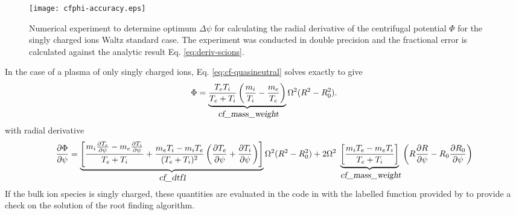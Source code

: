 \begin{figure}
\begin{center}
\texttt{[image: cfphi-accuracy.eps]}
\caption{Numerical experiment to determine optimum $\Delta \psi$ for calculating the radial derivative of the centrifugal potential $\Phi$ for the singly charged ions Waltz standard case. The experiment was conducted in double precision and the fractional error is calculated against the analytic result Eq. \ref{eq:deriv-scions}.}

\label{fig:cfphi-acc}
\end{center}
\end{figure}

In the case of a plasma of only singly charged ions, Eq. \ref{eq:cf-quasineutral} solves exactly to give
\begin{equation}
 \Phi = \underbrace{{T_e T_i \over T_e + T_i} \left({m_i \over T_i} - {m_e \over T_e}\right)}_{\name{cf_mass_weight}} \Omega^2 (R^2-R_0^2).
\label{eq:scions}
\end{equation}
with radial derivative 
\begin{equation}
 {\partial \Phi \over \partial \psi} = \underbrace{\left[{m_i {\partial T_e \over \partial \psi}- m_e {\partial T_i \over \partial \psi}\over T_e + T_i} + 
{m_e T_i - m_i T_e \over (T_e + T_i)^2}\left({\partial T_e \over \partial \psi}+{\partial T_i \over \partial \psi}\right)\right]}_{\name{cf_dtf1}}\Omega^2(R^2-R_0^2) 
+2 \Omega^2 \underbrace{\left[{m_i T_e - m_e T_i \over T_e + T_i}\right]}_{\name{cf_mass_weight}} 
\left(R {\partial R \over \partial \psi}-R_0 {\partial R_0 \over \partial \psi}\right)
\label{eq:deriv-scions}
\end{equation}
If the bulk ion species is singly charged, these quantities are evaluated in the code in  with the labelled function provided by  to provide a check on the solution of the root finding algorithm.  

